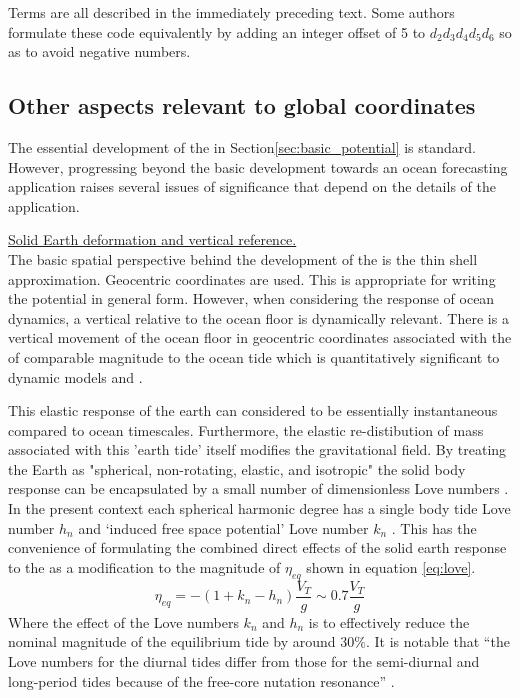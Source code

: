 Terms are all described in the immediately preceding text.
Some authors formulate these code equivalently by adding an integer offset of 5 to $d_2d_3d_4d_5d_6$ so as to avoid negative numbers.

\subsection{Other aspects relevant to global coordinates}
\label{S:ATGP_extras}
The essential development of the \ATGP{} in Section\ref{sec:basic_potential} is standard.  However, progressing beyond the basic development towards an ocean forecasting application raises several issues of significance that depend on the details of the application.


\underline{Solid Earth deformation and vertical reference.}  \\
The basic spatial perspective behind the development of the \ATGP{} is the thin shell approximation.  Geocentric coordinates are used.  This is appropriate for writing the potential in general form.  However, when considering the response of ocean dynamics, a vertical relative to the ocean floor is dynamically relevant.  There is a vertical movement of the ocean floor in geocentric coordinates associated with the \ATGP{} of comparable magnitude to the ocean tide which is quantitatively significant to dynamic models \citep{Hendershott:1981ub} and \citep[pp.336]{gill1982atmosphere}.


This elastic response of the earth can considered to be essentially instantaneous compared to ocean timescales.  Furthermore, the elastic re-distibution of mass associated with this 'earth tide' itself modifies the gravitational field.    By treating the Earth as "spherical, non-rotating, elastic, and isotropic" the solid body response can be encapsulated by a small number of dimensionless Love numbers \citep{agnew2015}.  In the present context each spherical harmonic degree has a single body tide Love number $h_n$ and `induced free space potential' Love number $k_n$ \citep[Sec 5.3.3]{Urban:2013vl}. This has the convenience of formulating the combined direct effects of the solid earth response to the \ATGP{} as a modification to the magnitude of $\eta_{eq}$ shown in equation \ref{eq:love}.  
\begin{equation}
    \eta_{eq} = -(1+k_n-h_n) \frac{V_T}{g} \sim 0.7 \frac{V_T}{g}
    \label{eq:love}
\end{equation}
Where the effect of the Love numbers $k_n$ and $h_n$ is to effectively reduce the nominal magnitude of the equilibrium tide by around $30\%$. 
It is notable that ``the Love numbers for the diurnal tides differ from those for the semi-diurnal and long-period tides because of the free-core nutation resonance'' \citep{Arbic:2004wz}.

